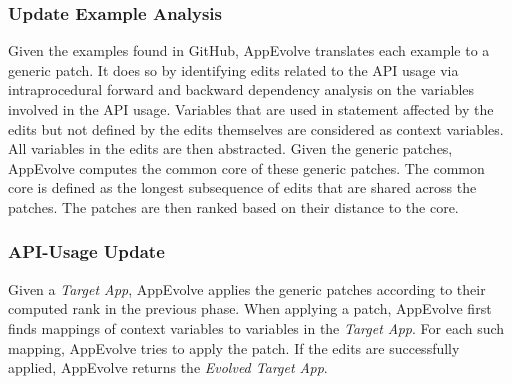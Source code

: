 \subsubsection{Update Example Analysis}
Given the examples found in GitHub, AppEvolve translates each example to a generic patch. It does so by identifying edits related to the API usage via intraprocedural forward and backward dependency analysis on the variables involved in the API usage. Variables that are used in statement affected by the edits but not defined by the edits themselves are considered as context variables. All variables in the edits are then abstracted. Given the generic patches, AppEvolve computes  the common core of these generic patches. The common core is defined as the longest subsequence of edits that are shared across the patches. The patches are then ranked based on their distance to the core.

\subsubsection{API-Usage Update}
Given a {\em Target App}, AppEvolve applies the generic patches according to their computed rank in the previous phase. When applying a patch, AppEvolve first finds mappings of context variables to variables in the {\em Target App}. For each such mapping, AppEvolve tries to apply the patch. If the edits are successfully applied, AppEvolve returns the {\em Evolved Target App}.

%
